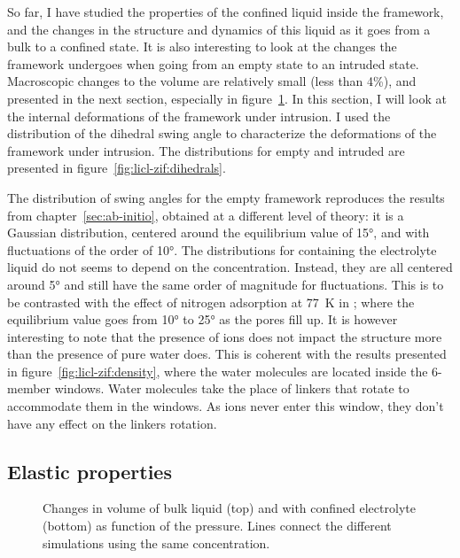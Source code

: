 \documentclass[thesis]{subfiles}
\begin{document}
So far, I have studied the properties of the confined liquid inside the 
framework, and the changes in the structure and dynamics of this liquid as it
goes from a bulk to a confined state. It is also interesting to look at the
changes the framework undergoes when going from an empty state to an intruded
state. Macroscopic changes to the volume are relatively small (less than 4\%),
and presented in the next section, especially in figure~\ref{fig:licl-zif:pv}.
In this section, I will look at the internal deformations of the framework
under intrusion. I used the distribution of the  dihedral swing
angle to characterize the deformations of the framework under intrusion. The
distributions for empty and intruded  are presented in
figure~\ref{fig:licl-zif:dihedrals}.

The distribution of swing angles for the empty framework reproduces the results
from chapter~\ref{sec:ab-initio}, obtained at a different level of theory: it is
a Gaussian distribution, centered around the equilibrium value of 15°, and with
fluctuations of the order of 10°. The distributions for  containing the
electrolyte liquid do not seems to depend on the concentration. Instead, they
are all centered around 5° and still have the same order of magnitude for
fluctuations. This is to be contrasted with the effect of nitrogen adsorption at
\SI{77}{K} in ; where the equilibrium value goes from 10° to 25° as the
pores fill up. It is however interesting to note that the presence of ions does
not impact the structure more than the presence of pure water does. This is
coherent with the results presented in figure~\ref{fig:licl-zif:density}, where
the water molecules are located inside the 6-member windows. Water molecules
take the place of linkers that rotate to accommodate them in the windows. As
ions never enter this window, they don't have any effect on the linkers
rotation.

\subsection{Elastic properties}

\begin{figure}[ht]
    \centering
    
    \caption{Changes in volume of bulk liquid (top) and  with confined electrolyte
    (bottom) as function of the pressure. Lines connect the different simulations
    using the same concentration.}
    \label{fig:licl-zif:pv}
\end{figure}
\end{document}
